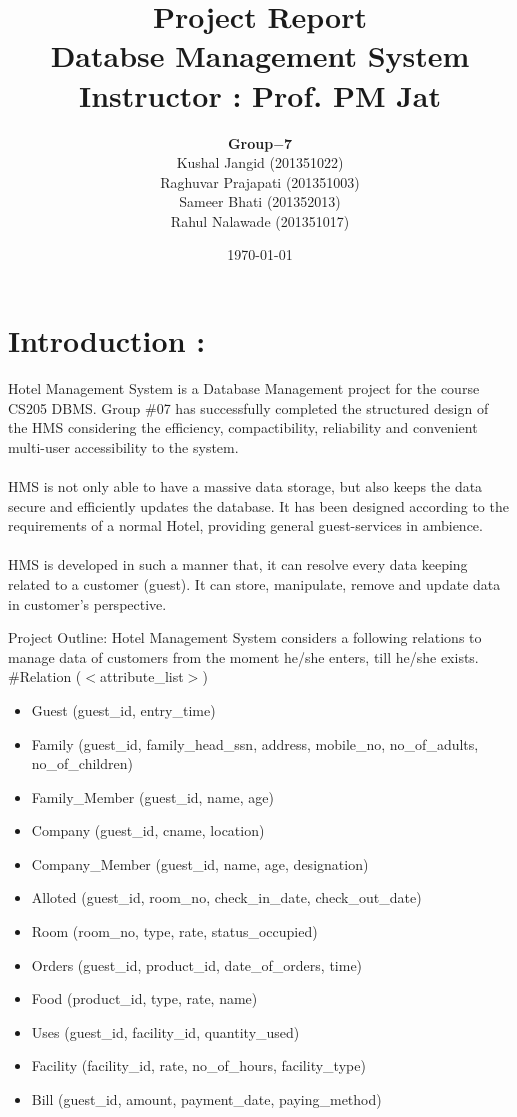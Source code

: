 \documentclass[a4,12pt]{report}
\title{ Project Report \\
						\textbf{Databse Management System}\\ Instructor : Prof. PM Jat }
\author{\textbf{Group$-$7} \\
			Kushal Jangid (201351022)\\
			Raghuvar Prajapati (201351003)\\
			Sameer Bhati (201352013)\\
			Rahul Nalawade (201351017) }
\date{\today}
\begin{document}
\maketitle
\section*{Introduction :} Hotel Management System is a Database Management project for the course CS205 DBMS. Group \#07 has successfully completed the structured design of the HMS considering the efficiency, compactibility, reliability and convenient multi-user accessibility to the system.\\\\
	HMS is not only able to have a massive data storage, but also keeps the data secure and efficiently updates the database. It has been designed according to the requirements of a normal Hotel, providing general guest-services in ambience.\\\\
HMS is developed in such a manner that, it can resolve every data keeping related to a customer (guest). It can store, manipulate, remove and update data in customer's perspective. 


Project Outline:
	Hotel Management System considers a following relations to manage data of customers from the moment he/she enters, till he/she exists.\\

\#Relation ($<$attribute\_list$>$)

\begin{itemize}
\item Guest (guest\_id, entry\_time)\\
\item Family (guest\_id, family\_head\_ssn, address, mobile\_no, no\_of\_adults, no\_of\_children)\\
\item Family\_Member (guest\_id, name, age)\\
\item Company (guest\_id, cname, location)\\
\item Company\_Member (guest\_id, name, age, designation)\\
\item Alloted (guest\_id, room\_no, check\_in\_date, check\_out\_date)\\
\item Room (room\_no, type, rate, status\_occupied)\\
\item Orders (guest\_id, product\_id, date\_of\_orders, time)\\
\item Food (product\_id, type, rate, name)\\
\item Uses (guest\_id, facility\_id, quantity\_used)\\
\item Facility (facility\_id, rate, no\_of\_hours, facility\_type)\\
\item Bill (guest\_id, amount, payment\_date, paying\_method)\\
\end{itemize}
\newpage
\end{document}
